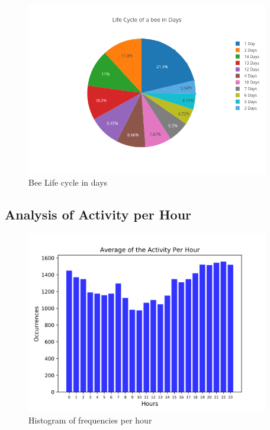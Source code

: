 \documentclass[11pt,fleqn]{book} %
\begin{document}
%


\begin{figure}[h!]%
\centering%
\includegraphics[width=400px]{Pictures/Morelia Hive 2pieBeeLifeCycleUnclean.png}%
\caption{Bee Life cycle in days}%
\end{figure}

%
\subsection{Analysis of Activity per Hour}%
\label{subsec:Analysis of Activity per Hour}%


\begin{figure}[h!]%
\centering%
\includegraphics[width=400px]{Pictures/Morelia Hive 2histogramUnclean.png}%
\caption{Histogram of frequencies per hour}%
\end{figure}

%
\end{document}
